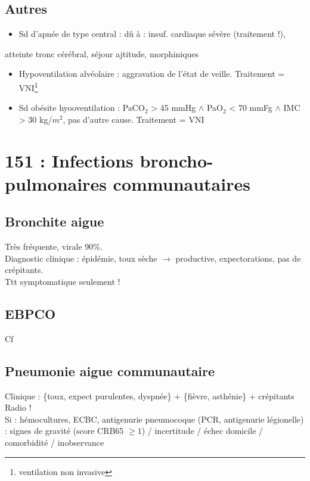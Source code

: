 \subsection{Autres}
\begin{itemize}
  \item Sd d'apnée de type central : dû à : insuf. cardiaque sévère (traitement !),
\end{itemize}
atteinte tronc cérébral, séjour ajtitude, morphiniques
\begin{itemize}
  \item Hypoventilation alvéolaire : aggravation de l'état de veille. Traitement =
    VNI\footnote{ventilation non invasive}
  \item Sd obésite hyooventilation :  PaCO\(_{\text{2}}\) > 45 mmHg \(\wedge\) PaO\(_{\text{2}}\) < 70 mmFg \(\wedge\)
    IMC > 30 kg/\(m^2\), pas d'autre cause. Traitement = VNI
\end{itemize}

\section{151 : Infections broncho-pulmonaires communautaires}
\subsection{Bronchite aigue}
Très fréquente, virale 90\%. \\
Diagnostic clinique : épidémie, toux sèche \(\to\) productive, expectorations,
pas de crépitants.\\
Ttt symptomatique seulement !

\subsection{EBPCO} Cf~

\subsection{Pneumonie aigue communautaire}
Clinique : \{toux, expect purulentes, dyspnée\} + \{fièvre, asthénie\} +
crépitants\\
Radio !\\
Si \faHospitalO : hémocultures, ECBC, antigenurie pneumocoque (PCR,
antigenurie légionelle)\\
\faHospitalO : signes de gravité (score CRB65 \(\ge 1\)) / incertitude / échec domicile / comorbidité / inobservance

